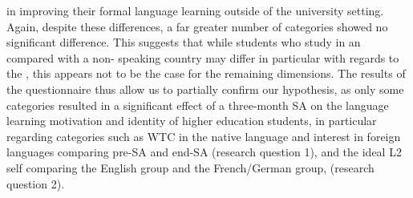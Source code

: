 \documentclass[output=paper]{langsci/langscibook}
\begin{document}
in improving their formal language learning outside of the university setting. Again, despite these differences, a far greater number of categories showed no significant difference. This suggests that while students who study in an  compared with a non- speaking country may differ in particular with regards to the , this appears not to be the case for the remaining dimensions. 
	The results of the questionnaire thus allow us to partially confirm our hypothesis, as only some categories resulted in a significant effect of a three-month SA on the language learning motivation and identity of higher education students, in particular regarding categories such as WTC in the native language and interest in foreign languages comparing pre-SA and end-SA (research question 1), and the ideal L2 self comparing the English group and the French/German group, (research question 2). 
\end{document}
